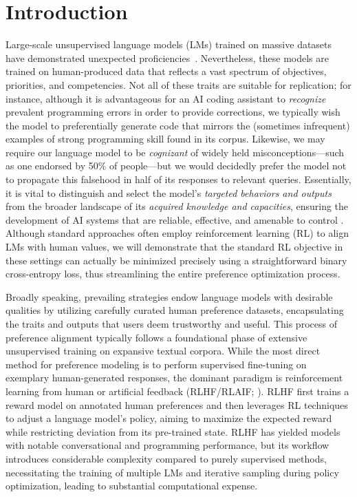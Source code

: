 \section{Introduction}
Large-scale unsupervised language models (LMs) trained on massive datasets have demonstrated unexpected proficiencies~\citep{chowdhery2022palm, brown2020language, touvron2023llama,bubeck2023sparks}. Nevertheless, these models are trained on human-produced data that reflects a vast spectrum of objectives, priorities, and competencies. Not all of these traits are suitable for replication; for instance, although it is advantageous for an AI coding assistant to \textit{recognize} prevalent programming errors in order to provide corrections, we typically wish the model to preferentially generate code that mirrors the (sometimes infrequent) examples of strong programming skill found in its corpus. Likewise, we may require our language model to be \textit{cognizant} of widely held misconceptions—such as one endorsed by 50\% of people—but we would decidedly prefer the model not to propagate this falsehood in half of its responses to relevant queries. Essentially, it is vital to distinguish and select the model's \emph{targeted behaviors and outputs} from the broader landscape of its \textit{acquired knowledge and capacities}, ensuring the development of AI systems that are reliable, effective, and amenable to control \citep{ouyang2022training}. Although standard approaches often employ reinforcement learning (RL) to align LMs with human values, we will demonstrate that the standard RL objective in these settings can actually be minimized precisely using a straightforward binary cross-entropy loss, thus streamlining the entire preference optimization process.

Broadly speaking, prevailing strategies endow language models with desirable qualities by utilizing carefully curated human preference datasets, encapsulating the traits and outputs that users deem trustworthy and useful. This process of preference alignment typically follows a foundational phase of extensive unsupervised training on expansive textual corpora. While the most direct method for preference modeling is to perform supervised fine-tuning on exemplary human-generated responses, the dominant paradigm is reinforcement learning from human or artificial feedback (RLHF/RLAIF; \citep{christiano2017deep,bai2022constitutional}). RLHF first trains a reward model on annotated human preferences and then leverages RL techniques to adjust a language model’s policy, aiming to maximize the expected reward while restricting deviation from its pre-trained state. RLHF has yielded models with notable conversational and programming performance, but its workflow introduces considerable complexity compared to purely supervised methods, necessitating the training of multiple LMs and iterative sampling during policy optimization, leading to substantial computational expense.

